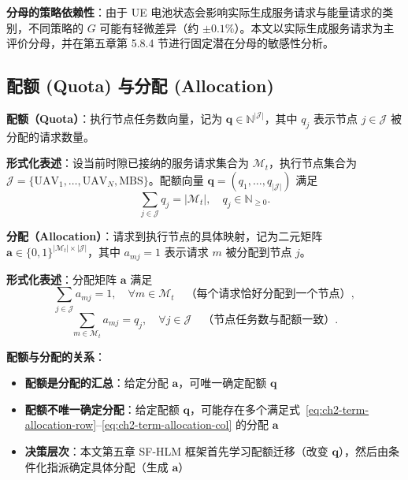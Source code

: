 \textbf{分母的策略依赖性}：由于 UE 电池状态会影响实际生成服务请求与能量请求的类别，不同策略的 $G$ 可能有轻微差异（约 $\pm 0.1\%$）。本文以实际生成服务请求为主评价分母，并在第五章第 5.8.4 节进行固定潜在分母的敏感性分析。

\subsection{配额 (Quota) 与分配 (Allocation)}
\label{sec:ch2-term-quota-allocation}

\textbf{配额（Quota）}：执行节点任务数向量，记为 $\mathbf{q} \in \mathbb{N}^{|\mathcal{J}|}$，其中 $q_j$ 表示节点 $j \in \mathcal{J}$ 被分配的请求数量。

\textbf{形式化表述}：设当前时隙已接纳的服务请求集合为 $\mathcal{M}_t$，执行节点集合为 $\mathcal{J} = \{\text{UAV}_1, \ldots, \text{UAV}_N, \text{MBS}\}$。配额向量 $\mathbf{q} = (q_1, \ldots, q_{|\mathcal{J}|})$ 满足
\begin{equation}
    \sum_{j \in \mathcal{J}} q_j = |\mathcal{M}_t|, \quad q_j \in \mathbb{N}_{\geq 0}.
    \label{eq:ch2-term-quota}
\end{equation}

\textbf{分配（Allocation）}：请求到执行节点的具体映射，记为二元矩阵 $\mathbf{a} \in \{0,1\}^{|\mathcal{M}_t| \times |\mathcal{J}|}$，其中 $a_{mj} = 1$ 表示请求 $m$ 被分配到节点 $j$。

\textbf{形式化表述}：分配矩阵 $\mathbf{a}$ 满足
\begin{equation}
    \sum_{j \in \mathcal{J}} a_{mj} = 1, \quad \forall m \in \mathcal{M}_t \quad \text{（每个请求恰好分配到一个节点）},
    \label{eq:ch2-term-allocation-row}
\end{equation}
\begin{equation}
    \sum_{m \in \mathcal{M}_t} a_{mj} = q_j, \quad \forall j \in \mathcal{J} \quad \text{（节点任务数与配额一致）}.
    \label{eq:ch2-term-allocation-col}
\end{equation}

\textbf{配额与分配的关系}：
\begin{itemize}
    \item \textbf{配额是分配的汇总}：给定分配 $\mathbf{a}$，可唯一确定配额 $\mathbf{q}$
    \item \textbf{配额不唯一确定分配}：给定配额 $\mathbf{q}$，可能存在多个满足式~\eqref{eq:ch2-term-allocation-row}--\eqref{eq:ch2-term-allocation-col} 的分配 $\mathbf{a}$
    \item \textbf{决策层次}：本文第五章 SF-HLM 框架首先学习配额迁移（改变 $\mathbf{q}$），然后由条件化指派确定具体分配（生成 $\mathbf{a}$）
\end{itemize}

